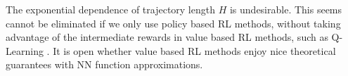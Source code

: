 The exponential dependence of trajectory length $H$ is undesirable. This seems cannot be eliminated if we only use policy based RL methods, without taking advantage of the intermediate rewards in value based RL methods, such as Q-Learning \citep{jin2018q}. It is open whether value based RL methods enjoy nice theoretical guarantees with NN function approximations.
